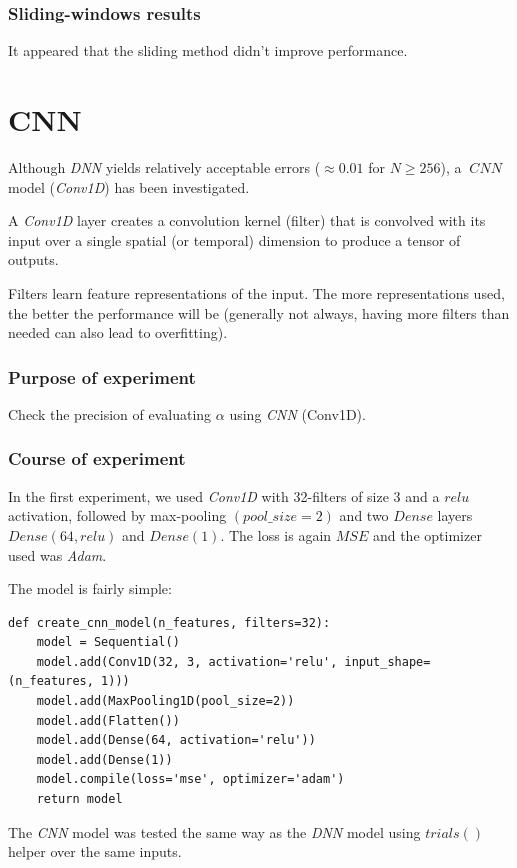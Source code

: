 \documentclass[a4paper, 12pt]{report}
\begin{document}
\subsubsection{Sliding-windows results}
It appeared that the sliding method didn't improve performance.

\section{CNN}
Although \textit{DNN} yields relatively acceptable errors ($\approx 0.01$ for $N \geq 256$), a $~CNN$ model (\textit{Conv1D}) has been investigated.

A \textit{Conv1D} layer creates a convolution kernel (filter) that is convolved with its input over a single spatial (or temporal) dimension to produce a tensor of outputs.

Filters learn feature representations of the input. The more representations used, the better the performance will be (generally not always, having more filters than needed can also lead to overfitting).

\subsubsection{Purpose of experiment}
Check the precision of evaluating $\alpha$ using \textit{CNN} (Conv1D).

\subsubsection{Course of experiment}
In the first experiment, we used \textit{Conv1D} with 32-filters of size 3 and a $relu$ activation, followed by max-pooling $(pool\_size=2)$ and two $Dense$ layers $Dense(64, relu)$ and $Dense(1)$. The loss is again $MSE$ and the optimizer used was \textit{Adam}.

The model is fairly simple:
\begin{verbatim}
def create_cnn_model(n_features, filters=32):
    model = Sequential()
    model.add(Conv1D(32, 3, activation='relu', input_shape=(n_features, 1)))
    model.add(MaxPooling1D(pool_size=2))
    model.add(Flatten())
    model.add(Dense(64, activation='relu'))
    model.add(Dense(1))
    model.compile(loss='mse', optimizer='adam')
    return model
\end{verbatim}

The \textit{CNN} model was tested the same way as the \textit{DNN} model using $trials()$ helper over the same inputs.
\end{document}
